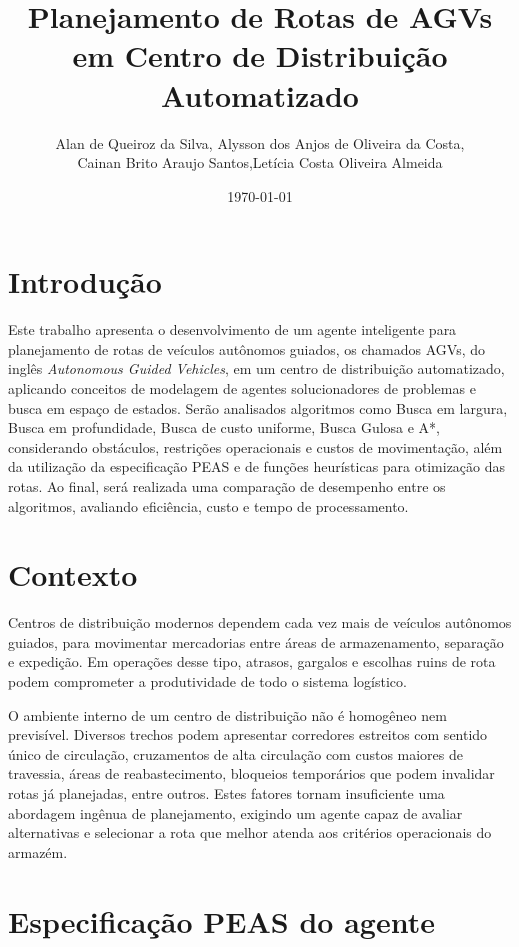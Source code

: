 \documentclass[12pt,a4paper]{article}
\title{Planejamento de Rotas de AGVs em Centro de Distribuição Automatizado}
\date{\today}
\author{Alan de Queiroz da Silva, Alysson dos Anjos de Oliveira da Costa, \\Cainan Brito Araujo Santos,Letícia Costa Oliveira Almeida}
\begin{document}
 
\maketitle

\section{Introdução}

Este trabalho apresenta o desenvolvimento de um agente inteligente para planejamento de rotas de veículos autônomos guiados, os chamados AGVs, do inglês \textit{Autonomous Guided Vehicles}, em um centro de distribuição automatizado, aplicando conceitos de modelagem de agentes solucionadores de problemas e busca em espaço de estados. Serão analisados algoritmos como Busca em largura, Busca em profundidade, Busca de custo uniforme, Busca Gulosa e A*, considerando obstáculos, restrições operacionais e custos de movimentação, além da utilização da especificação PEAS e de funções heurísticas para otimização das rotas. Ao final, será realizada uma comparação de desempenho entre os algoritmos, avaliando eficiência, custo e tempo de processamento.

\section{Contexto}

Centros de distribuição modernos dependem cada vez mais de veículos autônomos guiados, para movimentar mercadorias entre áreas de armazenamento, separação e expedição. Em operações desse tipo, atrasos, gargalos e escolhas ruins de rota podem comprometer a produtividade de todo o sistema logístico.

O ambiente interno de um centro de distribuição não é homogêneo nem previsível. Diversos trechos podem apresentar corredores estreitos com sentido único de circulação, cruzamentos de alta circulação com custos maiores de travessia, áreas de reabastecimento, bloqueios temporários que podem invalidar rotas já planejadas, entre outros. Estes fatores tornam insuficiente uma abordagem ingênua de planejamento, exigindo um agente capaz de avaliar alternativas e 
selecionar a rota que melhor atenda aos critérios operacionais do armazém.

\section{Especificação PEAS do agente}
\end{document}
